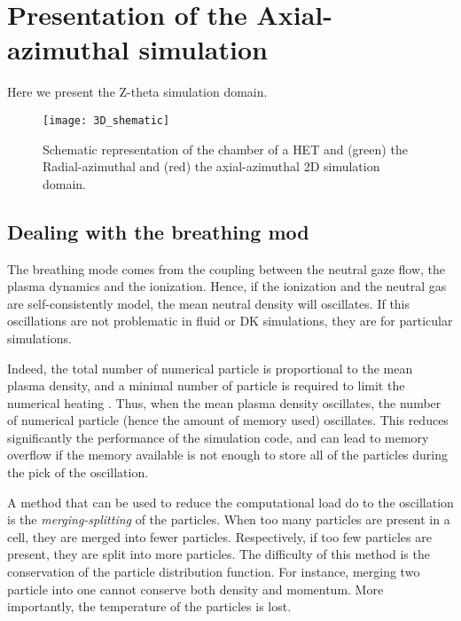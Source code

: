 
\section{Presentation of the Axial-azimuthal simulation}


Here we present the Z-theta simulation domain.


\begin{figure}[hbtp]
  \centering
  \texttt{[image: 3D\_shematic]}
  \caption{Schematic representation of the chamber of a \ac{HET} and (green) the Radial-azimuthal and (red) the axial-azimuthal 2D simulation domain.}
  \label{fig-3Dschematic}
\end{figure}

\subsection{Dealing with the breathing mod} \label{subsec-label}

The breathing mode comes from the coupling between the neutral gaze flow, the plasma dynamics and the ionization.
Hence, if the ionization and the neutral gas are self-consistently model, the mean neutral density will oscillates.
If this oscillations are not problematic in fluid or \ac{DK} simulations, they are for particular simulations.

Indeed, the total number of numerical particle is proportional to the mean plasma density, and a minimal number of particle is required to limit the numerical heating \citep{turner2006}.
Thus, when the mean plasma density oscillates, the number of numerical particle (hence the amount of memory used) oscillates.
This reduces significantly the performance of the simulation code, and can lead to memory overflow if the memory available is not enough to store all of the particles during the pick of the oscillation.

A method that can be used to reduce the computational load do to the oscillation is the \emph{merging-splitting} of the particles.
When too many particles are present in a cell, they are merged into fewer particles.
Respectively, if too few particles are present, they are split into more particles.
The difficulty of this method is the conservation of the particle distribution function.
For instance, merging two particle into one cannot conserve both density and momentum.
More importantly, the temperature of the particles is lost.

